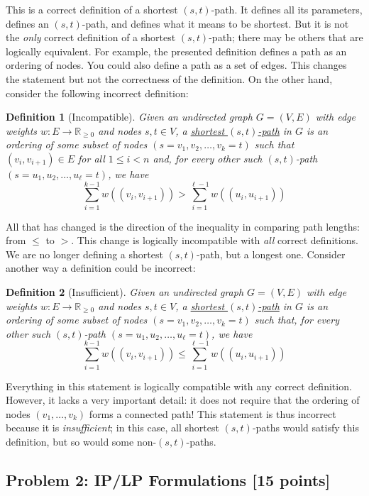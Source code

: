 \documentclass[10pt]{article}
\newtheorem*{definition}{Definition}
\begin{document}
This is a correct definition of a shortest $(s,t)$-path.
It defines all its parameters, defines an $(s,t)$-path, and defines what it means to be shortest.
But it is not the \textit{only} correct definition of a shortest $(s,t)$-path; there may be others that are logically equivalent.
For example, the presented definition defines a path as an ordering of nodes.
You could also define a path as a set of edges.
This changes the statement but not the correctness of the definition.
On the other hand, consider the following incorrect definition:

\begin{definition}[Incompatible]
Given an undirected graph $G = (V, E)$ with edge weights $w : E \to \mathbb{R}_{\geq 0}$ and nodes $s, t \in V$, a \underline{shortest $(s,t)$-path} in $G$ is an ordering of some subset of nodes $(s = v_1, v_2, \ldots, v_k = t)$ such that $(v_i, v_{i+1}) \in E$ for all $1 \leq i < n$ and, for every other such $(s,t)$-path $(s = u_1, u_2, \ldots, u_\ell = t)$, we have
\[\sum_{i=1}^{k-1} w((v_i, v_{i+1})) > \sum_{i=1}^{\ell - 1} w((u_i, u_{i+1}))\]
\end{definition}

All that has changed is the direction of the inequality in comparing path lengths: from $\leq$ to $>$.
This change is logically incompatible with \textit{all} correct definitions.
We are no longer defining a shortest $(s,t)$-path, but a longest one.
Consider another way a definition could be incorrect:

\begin{definition}[Insufficient]
Given an undirected graph $G = (V, E)$ with edge weights $w : E \to \mathbb{R}_{\geq 0}$ and nodes $s, t \in V$, a \underline{shortest $(s,t)$-path} in $G$ is an ordering of some subset of nodes $(s = v_1, v_2, \ldots, v_k = t)$ such that, for every other such $(s,t)$-path $(s = u_1, u_2, \ldots, u_\ell = t)$, we have
\[\sum_{i=1}^{k-1} w((v_i, v_{i+1})) \leq \sum_{i=1}^{\ell - 1} w((u_i, u_{i+1}))\]
\end{definition}

Everything in this statement is logically compatible with any correct definition.
However, it lacks a very important detail: it does not require that the ordering of nodes $(v_1, \ldots, v_k)$ forms a connected path!
This statement is thus incorrect because it is \textit{insufficient}; in this case, all shortest $(s,t)$-paths would satisfy this definition, but so would some non-$(s,t)$-paths.

\subsection{Problem 2: IP/LP Formulations [15 points]}
\end{document}
